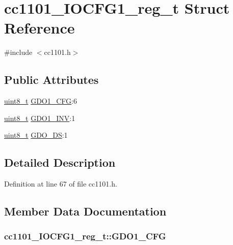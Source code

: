 \hypertarget{structcc1101___i_o_c_f_g1__reg__t}{}\section{cc1101\+\_\+\+I\+O\+C\+F\+G1\+\_\+reg\+\_\+t Struct Reference}
\label{structcc1101___i_o_c_f_g1__reg__t}


{\ttfamily \#include $<$cc1101.\+h$>$}

\subsection*{Public Attributes}
\begin{DoxyCompactItemize}
\item 
\hyperlink{_p_e___types_8h_aba7bc1797add20fe3efdf37ced1182c5}{uint8\+\_\+t} \hyperlink{structcc1101___i_o_c_f_g1__reg__t_a33e871b8f5bd33df24922eec0906c4d2}{G\+D\+O1\+\_\+\+C\+FG}\+:6
\item 
\hyperlink{_p_e___types_8h_aba7bc1797add20fe3efdf37ced1182c5}{uint8\+\_\+t} \hyperlink{structcc1101___i_o_c_f_g1__reg__t_a8316bbca3a9bab5ed3a543e4c1b27cf9}{G\+D\+O1\+\_\+\+I\+NV}\+:1
\item 
\hyperlink{_p_e___types_8h_aba7bc1797add20fe3efdf37ced1182c5}{uint8\+\_\+t} \hyperlink{structcc1101___i_o_c_f_g1__reg__t_a89e14d3dbc30c43192ad3aa0616a7a3b}{G\+D\+O\+\_\+\+DS}\+:1
\end{DoxyCompactItemize}


\subsection{Detailed Description}


Definition at line 67 of file cc1101.\+h.



\subsection{Member Data Documentation}
\subsubsection[{\texorpdfstring{G\+D\+O1\+\_\+\+C\+FG}{GDO1_CFG}}]{ cc1101\+\_\+\+I\+O\+C\+F\+G1\+\_\+reg\+\_\+t\+::\+G\+D\+O1\+\_\+\+C\+FG}\hypertarget{structcc1101___i_o_c_f_g1__reg__t_a33e871b8f5bd33df24922eec0906c4d2}{}\label{structcc1101___i_o_c_f_g1__reg__t_a33e871b8f5bd33df24922eec0906c4d2}


